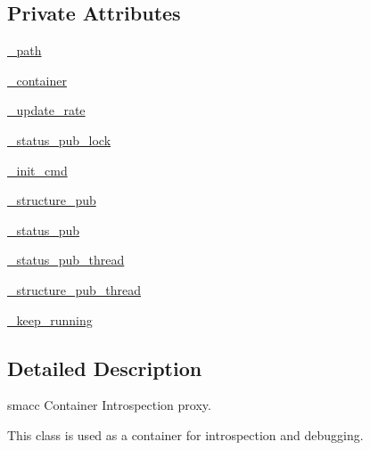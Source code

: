 \subsection*{Private Attributes}
\begin{DoxyCompactItemize}
\item 
\hyperlink{classsmacc__viewer_1_1introspection__container_1_1ContainerProxy_a1196c9f62c5bf656de0dddba97f57884}{\+\_\+path}
\item 
\hyperlink{classsmacc__viewer_1_1introspection__container_1_1ContainerProxy_a3148d29e291a87befdab3faa03ed6c62}{\+\_\+container}
\item 
\hyperlink{classsmacc__viewer_1_1introspection__container_1_1ContainerProxy_a0c5222106d95d0d78632d21873b7d2a8}{\+\_\+update\+\_\+rate}
\item 
\hyperlink{classsmacc__viewer_1_1introspection__container_1_1ContainerProxy_a666abcc33df4a2601f414eb66867a634}{\+\_\+status\+\_\+pub\+\_\+lock}
\item 
\hyperlink{classsmacc__viewer_1_1introspection__container_1_1ContainerProxy_a32df154fd0035346ac0ba4032f67e73e}{\+\_\+init\+\_\+cmd}
\item 
\hyperlink{classsmacc__viewer_1_1introspection__container_1_1ContainerProxy_a3bea5a75a0e6fe5533d7d4603c00bd8a}{\+\_\+structure\+\_\+pub}
\item 
\hyperlink{classsmacc__viewer_1_1introspection__container_1_1ContainerProxy_ac1f04f2ed4690fc523f493f046b45429}{\+\_\+status\+\_\+pub}
\item 
\hyperlink{classsmacc__viewer_1_1introspection__container_1_1ContainerProxy_a87e0bcbc92c4e5ec369758ea926384b5}{\+\_\+status\+\_\+pub\+\_\+thread}
\item 
\hyperlink{classsmacc__viewer_1_1introspection__container_1_1ContainerProxy_a00018ba687ca1270027dfec38c9de100}{\+\_\+structure\+\_\+pub\+\_\+thread}
\item 
\hyperlink{classsmacc__viewer_1_1introspection__container_1_1ContainerProxy_ae4526126fccd31f57df2e44b04de8517}{\+\_\+keep\+\_\+running}
\end{DoxyCompactItemize}


\subsection{Detailed Description}
\begin{DoxyVerb}smacc Container Introspection proxy.

This class is used as a container for introspection and debugging.
\end{DoxyVerb}
 

